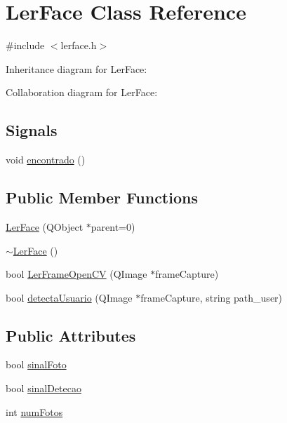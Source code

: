\hypertarget{classLerFace}{}\section{Ler\+Face Class Reference}
\label{classLerFace}


{\ttfamily \#include $<$lerface.\+h$>$}



Inheritance diagram for Ler\+Face\+:


Collaboration diagram for Ler\+Face\+:
\subsection*{Signals}
\begin{DoxyCompactItemize}
\item 
void \hyperlink{classLerFace_a44cfb4d5edcec999262133eecc5db8ca}{encontrado} ()
\end{DoxyCompactItemize}
\subsection*{Public Member Functions}
\begin{DoxyCompactItemize}
\item 
\hyperlink{classLerFace_a3f3b5ea9fa0b8b72369b26d8a62d4e47}{Ler\+Face} (Q\+Object $\ast$parent=0)
\item 
\hyperlink{classLerFace_a9982fdb254bc1c8f10dcaa3fd6135220}{$\sim$\+Ler\+Face} ()
\item 
bool \hyperlink{classLerFace_a9aaa104080dc5c19ebecb8f8100d5bf1}{Ler\+Frame\+Open\+CV} (Q\+Image $\ast$frame\+Capture)
\item 
bool \hyperlink{classLerFace_a4c583c451012d0657e6f18a45e1fd682}{detecta\+Usuario} (Q\+Image $\ast$frame\+Capture, string path\+\_\+user)
\end{DoxyCompactItemize}
\subsection*{Public Attributes}
\begin{DoxyCompactItemize}
\item 
bool \hyperlink{classLerFace_a2de1b8f2ac4b033efedc0495b2256248}{sinal\+Foto}
\item 
bool \hyperlink{classLerFace_a5369a5293499d722efcae2ee1a4913bb}{sinal\+Detecao}
\item 
int \hyperlink{classLerFace_a3ea5d03ef2dd0065021014be69909d65}{num\+Fotos}
\end{DoxyCompactItemize}


